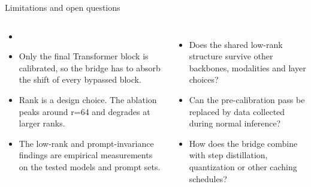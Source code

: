\begin{frame}{Limitations and open questions}
\begin{columns}[T]
\begin{itemize}
  \item [object Object]
  \item Only the final Transformer block is calibrated, so the bridge has to absorb the shift of every bypassed block.
  \item Rank is a design choice. The ablation peaks around r=64 and degrades at larger ranks.
  \item The low-rank and prompt-invariance findings are empirical measurements on the tested models and prompt sets.
\end{itemize}
\begin{itemize}
  \item Does the shared low-rank structure survive other backbones, modalities and layer choices?
  \item Can the pre-calibration pass be replaced by data collected during normal inference?
  \item How does the bridge combine with step distillation, quantization or other caching schedules?
\end{itemize}
\end{columns}
\end{frame}
